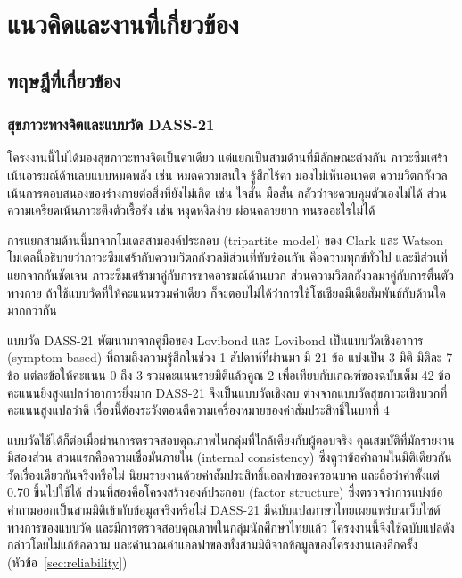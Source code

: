 \chapter{แนวคิดและงานที่เกี่ยวข้อง}

\section{ทฤษฎีที่เกี่ยวข้อง}

\subsection{สุขภาวะทางจิตและแบบวัด DASS-21}

โครงงานนี้ไม่ได้มองสุขภาวะทางจิตเป็นค่าเดียว แต่แยกเป็นสามด้านที่มีลักษณะต่างกัน
ภาวะซึมเศร้าเน้นอารมณ์ด้านลบแบบหมดพลัง เช่น หมดความสนใจ รู้สึกไร้ค่า มองไม่เห็นอนาคต
ความวิตกกังวลเน้นการตอบสนองของร่างกายต่อสิ่งที่ยังไม่เกิด เช่น ใจสั่น มือสั่น กลัวว่าจะควบคุมตัวเองไม่ได้
ส่วนความเครียดเน้นภาวะตึงตัวเรื้อรัง เช่น หงุดหงิดง่าย ผ่อนคลายยาก ทนรออะไรไม่ได้

การแยกสามด้านนี้มาจากโมเดลสามองค์ประกอบ (tripartite model) ของ Clark และ Watson
\cite{clark1991tripartite} โมเดลนี้อธิบายว่าภาวะซึมเศร้ากับความวิตกกังวลมีส่วนที่ทับซ้อนกัน
คือความทุกข์ทั่วไป และมีส่วนที่แยกจากกันชัดเจน ภาวะซึมเศร้ามาคู่กับการขาดอารมณ์ด้านบวก
ส่วนความวิตกกังวลมาคู่กับการตื่นตัวทางกาย
ถ้าใช้แบบวัดที่ให้คะแนนรวมค่าเดียว ก็จะตอบไม่ได้ว่าการใช้โซเชียลมีเดียสัมพันธ์กับด้านใดมากกว่ากัน

แบบวัด DASS-21 พัฒนามาจากคู่มือของ Lovibond และ Lovibond \cite{lovibond1995manual}
เป็นแบบวัดเชิงอาการ (symptom-based) ที่ถามถึงความรู้สึกในช่วง 1 สัปดาห์ที่ผ่านมา
มี 21 ข้อ แบ่งเป็น 3 มิติ มิติละ 7 ข้อ แต่ละข้อให้คะแนน 0 ถึง 3
รวมคะแนนรายมิติแล้วคูณ 2 เพื่อเทียบกับเกณฑ์ของฉบับเต็ม 42 ข้อ
คะแนนยิ่งสูงแปลว่าอาการยิ่งมาก DASS-21 จึงเป็นแบบวัดเชิงลบ
ต่างจากแบบวัดสุขภาวะเชิงบวกที่คะแนนสูงแปลว่าดี เรื่องนี้ต้องระวังตอนตีความเครื่องหมายของค่าสัมประสิทธิ์ในบทที่ 4

แบบวัดใช้ได้ก็ต่อเมื่อผ่านการตรวจสอบคุณภาพในกลุ่มที่ใกล้เคียงกับผู้ตอบจริง
คุณสมบัติที่มักรายงานมีสองส่วน ส่วนแรกคือความเชื่อมั่นภายใน (internal consistency)
ซึ่งดูว่าข้อคำถามในมิติเดียวกันวัดเรื่องเดียวกันจริงหรือไม่ นิยมรายงานด้วยค่าสัมประสิทธิ์แอลฟาของครอนบาค
และถือว่าค่าตั้งแต่ 0.70 ขึ้นไปใช้ได้ ส่วนที่สองคือโครงสร้างองค์ประกอบ (factor structure)
ซึ่งตรวจว่าการแบ่งข้อคำถามออกเป็นสามมิติเข้ากับข้อมูลจริงหรือไม่
DASS-21 มีฉบับแปลภาษาไทยเผยแพร่บนเว็บไซต์ทางการของแบบวัด \cite{webster2008thai}
และมีการตรวจสอบคุณภาพในกลุ่มนักศึกษาไทยแล้ว \cite{wittayapun2023validation}
โครงงานนี้จึงใช้ฉบับแปลดังกล่าวโดยไม่แก้ข้อความ
และคำนวณค่าแอลฟาของทั้งสามมิติจากข้อมูลของโครงงานเองอีกครั้ง (หัวข้อ~\ref{sec:reliability})

